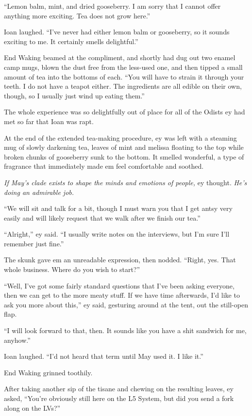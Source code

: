 ``Lemon balm, mint, and dried gooseberry. I am sorry that I cannot offer anything more exciting. Tea does not grow here.''

Ioan laughed. ``I've never had either lemon balm or gooseberry, so it sounds exciting to me. It certainly smells delightful.''

End Waking beamed at the compliment, and shortly had dug out two enamel camp mugs, blown the dust free from the less-used one, and then tipped a small amount of tea into the bottoms of each. ``You will have to strain it through your teeth. I do not have a teapot either. The ingredients are all edible on their own, though, so I usually just wind up eating them.''

The whole experience was so delightfully out of place for all of the Odists ey had met so far that Ioan was rapt.

At the end of the extended tea-making procedure, ey was left with a steaming mug of slowly darkening tea, leaves of mint and melissa floating to the top while broken chunks of gooseberry sunk to the bottom. It smelled wonderful, a type of fragrance that immediately made em feel comfortable and soothed.

\emph{If May's clade exists to shape the minds and emotions of people,} ey thought. \emph{He's doing an admirable job.}

``We will sit and talk for a bit, though I must warn you that I get antsy very easily and will likely request that we walk after we finish our tea.''

``Alright,'' ey said. ``I usually write notes on the interviews, but I'm sure I'll remember just fine.''

The skunk gave em an unreadable expression, then nodded. ``Right, yes. That whole business. Where do you wish to start?''

``Well, I've got some fairly standard questions that I've been asking everyone, then we can get to the more meaty stuff. If we have time afterwards, I'd like to ask you more about this,'' ey said, gesturing around at the tent, out the still-open flap.

``I will look forward to that, then. It sounds like you have a shit sandwich for me, anyhow.''

Ioan laughed. ``I'd not heard that term until May used it. I like it.''

End Waking grinned toothily.

After taking another sip of the tisane and chewing on the resulting leaves, ey asked, ``You're obviously still here on the L5 System, but did you send a fork along on the LVs?''

